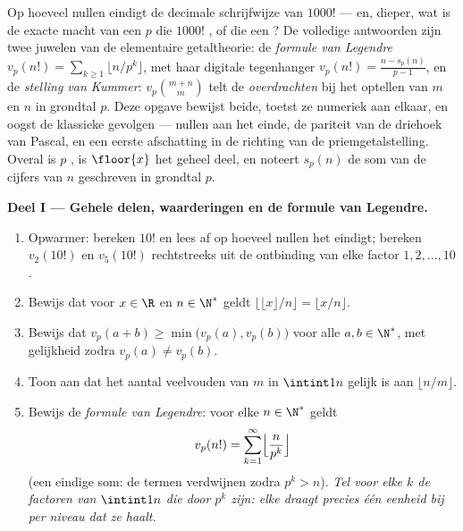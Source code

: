 \begin{problem}\label{pb:b1:arith:1}
Op hoeveel nullen eindigt de decimale schrijfwijze van $1000!$ --- en,
dieper, wat is de exacte macht van een  $p$ die $1000!$ ,
of die een  ? De volledige antwoorden zijn twee
juwelen van de elementaire getaltheorie: de \emph{formule van
Legendre} $v_p(n!) = \sum_{k\geq1} \lfloor
n/p^k \rfloor$, met haar digitale tegenhanger $v_p(n!) = \frac{n -
s_p(n)}{p-1}$, en de \emph{stelling van Kummer}: $v_p\binom{m+n}m$ telt de \emph{overdrachten} bij het optellen
van $m$ en $n$ in grondtal $p$. Deze opgave bewijst beide, toetst ze
numeriek aan elkaar, en oogst de klassieke gevolgen --- nullen aan het
einde, de pariteit van de driehoek van Pascal, en een eerste afschatting
in de richting van de priemgetalstelling. Overal is $p$ , is
$\floor{x}$ het geheel deel, en noteert $s_p(n)$ de som van de cijfers
van $n$ geschreven in grondtal $p$.

\medskip
\noindent\textbf{Deel I --- Gehele delen, waarderingen en de formule van
Legendre.}
\begin{enumerate}
  \item Opwarmer: bereken $10!$ en lees af op hoeveel nullen het
        eindigt; bereken $v_2(10!)$ en $v_5(10!)$ rechtstreeks uit de
        ontbinding van elke factor $1, 2, \dots, 10$.
  \item Bewijs dat voor $x \in \R$ en $n \in \N^*$ geldt $\bigl\lfloor
        \lfloor x \rfloor / n \bigr\rfloor = \lfloor x/n \rfloor$.
  \item Bewijs dat $v_p(a + b) \geq \min\bigl(v_p(a), v_p(b)\bigr)$ voor
        alle $a, b \in \N^*$, met gelijkheid zodra $v_p(a) \neq
        v_p(b)$.
  \item Toon aan dat het aantal veelvouden van $m$ in $\intint1n$ gelijk
        is aan $\lfloor n/m \rfloor$.
  \item Bewijs de \emph{formule van Legendre}: voor elke $n \in \N^*$
        geldt
        \[
        v_p(n!) = \sum_{k=1}^{\infty}
        \Bigl\lfloor \frac{n}{p^k} \Bigr\rfloor
        \]
        (een eindige som: de termen verdwijnen zodra $p^k > n$).
        \emph{Tel voor elke $k$ de factoren van $\intint1n$ die door
        $p^k$  zijn: elke draagt precies één eenheid bij per
        niveau dat ze haalt.}
\end{enumerate}


\end{problem}
